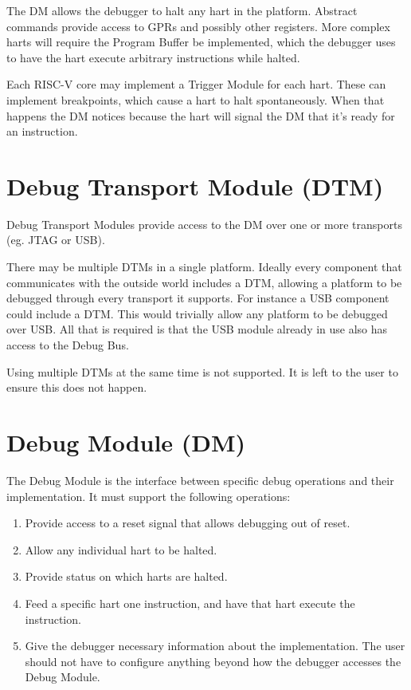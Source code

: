 \documentclass{article}
\newenvironment{steps}[1]
{
   \vspace{1ex}
   \noindent
   #1
   \begin{enumerate}[nosep]
}
{
   \end{enumerate}
   \vspace{1ex}
}
\begin{document}
The DM allows the debugger to halt any hart in the platform. Abstract commands
provide access to GPRs and possibly other registers. More complex harts will
require the Program Buffer be implemented, which the debugger uses to have the
hart execute arbitrary instructions while halted.

Each RISC-V core may implement a Trigger Module for each hart.  These can
implement breakpoints, which cause a hart to halt spontaneously.  When that
happens the DM notices because the hart will signal the DM that it's ready for
an instruction.

\section{Debug Transport Module (DTM)}

Debug Transport Modules provide access to the DM over one or more transports
(eg. JTAG or USB).

There may be multiple DTMs in a single platform. Ideally every component that
communicates with the outside world includes a DTM, allowing a platform to be
debugged through every transport it supports.  For instance a USB component
could include a DTM. This would trivially allow any platform to be debugged
over USB. All that is required is that the USB module already in use also has
access to the Debug Bus.

Using multiple DTMs at the same time is not supported. It is left to the user
to ensure this does not happen.

\section{Debug Module (DM)} \label{dm}

\begin{steps}{The Debug Module is the interface between specific debug
    operations and their implementation. It must support the following
    operations:}
\item Provide access to a reset signal that allows debugging out of reset.
\item Allow any individual hart to be halted.
\item Provide status on which harts are halted.
\item Feed a specific hart one instruction, and have that hart execute the
    instruction.
\item Give the debugger necessary information about the implementation. The user
    should not have to configure anything beyond how the debugger accesses the
    Debug Module.
\end{steps}
\end{document}
